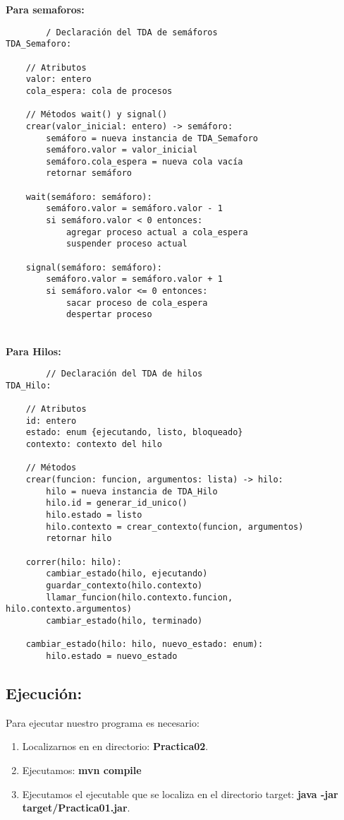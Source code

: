 \documentclass[12pt]{article}
\begin{document}
\begin{enumerate}
    \textbf{Para semaforos:}\\
    \begin{verbatim}
        / Declaración del TDA de semáforos
TDA_Semaforo:

    // Atributos
    valor: entero
    cola_espera: cola de procesos

    // Métodos wait() y signal()
    crear(valor_inicial: entero) -> semáforo:
        semáforo = nueva instancia de TDA_Semaforo
        semáforo.valor = valor_inicial
        semáforo.cola_espera = nueva cola vacía
        retornar semáforo

    wait(semáforo: semáforo):
        semáforo.valor = semáforo.valor - 1
        si semáforo.valor < 0 entonces:
            agregar proceso actual a cola_espera
            suspender proceso actual

    signal(semáforo: semáforo):
        semáforo.valor = semáforo.valor + 1
        si semáforo.valor <= 0 entonces:
            sacar proceso de cola_espera
            despertar proceso
    \end{verbatim}\\

    \textbf{Para Hilos:}\\
    \begin{verbatim}
        // Declaración del TDA de hilos
TDA_Hilo:

    // Atributos
    id: entero
    estado: enum {ejecutando, listo, bloqueado}
    contexto: contexto del hilo

    // Métodos
    crear(funcion: funcion, argumentos: lista) -> hilo:
        hilo = nueva instancia de TDA_Hilo
        hilo.id = generar_id_unico()
        hilo.estado = listo
        hilo.contexto = crear_contexto(funcion, argumentos)
        retornar hilo

    correr(hilo: hilo):
        cambiar_estado(hilo, ejecutando)
        guardar_contexto(hilo.contexto)
        llamar_funcion(hilo.contexto.funcion, hilo.contexto.argumentos)
        cambiar_estado(hilo, terminado)

    cambiar_estado(hilo: hilo, nuevo_estado: enum):
        hilo.estado = nuevo_estado
    \end{verbatim}
\end{enumerate}

{\color{blue} \subsection*{\textbf{Ejecución:}}}

Para ejecutar nuestro programa es necesario:\\

\begin{enumerate}
    \item Localizarnos en en directorio: \textbf{Practica02}.
    \item Ejecutamos: \textbf{mvn compile}
    \item Ejecutamos el ejecutable que se localiza en el directorio target: \textbf{java -jar target/Practica01.jar}. 
\end{enumerate}
\end{document}
